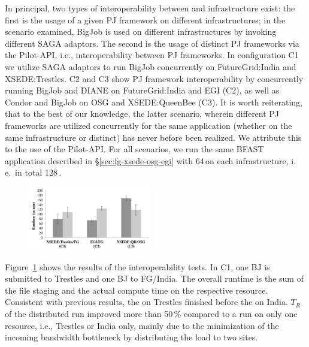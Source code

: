 \documentclass[conference]{IEEEtran}
\begin{document}
In principal, two types of interoperability between \pilotjobs and
infrastructure exist: the first is the usage of a given PJ framework
on different infrastructures; in the scenario examined, BigJob is used
on different infrastructures by invoking different SAGA adaptors.  The
second is the usage of distinct PJ frameworks via the Pilot-API, i.e.,
interoperability between PJ frameworks. In configuration C1 we utilize
SAGA adaptors to run BigJob concurrently on FutureGrid:India and
XSEDE:Trestles. C2 and C3 show PJ framework interoperability by
concurrently running BigJob and DIANE on FutureGrid:India and EGI
(C2), as well as Condor and BigJob on OSG and XSEDE:QueenBee (C3). It
is worth reiterating, that to the best of our knowledge, the latter
scenario, wherein different PJ frameworks are utilized concurrently
for the same application (whether on the same infrastructure or
distinct) has never before been realized. We attribute this to the use
of the Pilot-API.  For all scenarios, we run the same BFAST
application described in \S\ref{sec:fg-xsede-osg-egi} with 64\,\cus on
each infrastructure, i.\,e.\ in total 128\,\cus.

\begin{figure}[htbp]
  \upp
  	\centering
	\includegraphics[width=0.48\textwidth]{../perf/interop/128-bfast-interop-with-staging.pdf}
	\caption{}
	\label{fig:perf_interop_128-bfast-interop}
\end{figure}



Figure~\ref{fig:perf_interop_128-bfast-interop} shows the results of
the interoperability tests. In C1, one BJ \pilot is submitted to
Trestles and one BJ \pilot to FG/India.  The overall runtime is the
sum of the file staging and the actual compute time on the respective
resource. Consistent with previous results, the \pilot on Trestles
finished before the \pilot on India. $T_R$ of the distributed run
improved more than 50\,\% compared to a run on only one resource,
i.e., Trestles or India only, mainly due to the minimization of the
incoming bandwidth bottleneck by distributing the load to two sites.
\end{document}
